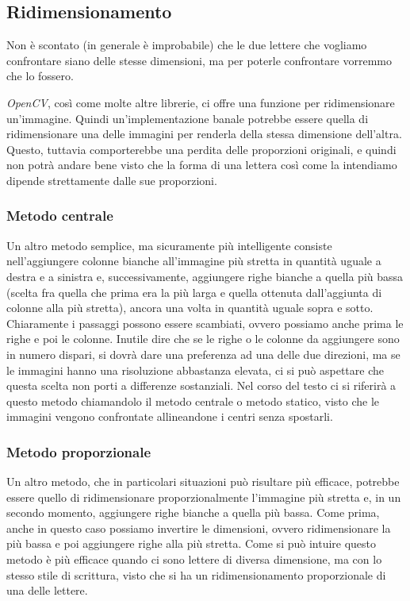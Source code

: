 \subsection{Ridimensionamento}\label{ssect:rescaling}

Non \`e scontato (in generale \`e improbabile) che le due lettere che vogliamo confrontare siano delle stesse dimensioni, ma per poterle confrontare vorremmo che lo fossero.

\emph{OpenCV}, cos\`i come molte altre librerie, ci offre una funzione per ridimensionare un'immagine. Quindi un'implementazione banale potrebbe essere quella di ridimensionare una delle immagini per renderla della stessa dimensione dell'altra. Questo, tuttavia comporterebbe una perdita delle proporzioni originali, e quindi non potr\`a andare bene visto che la forma di una lettera cos\`i come la intendiamo dipende strettamente dalle sue proporzioni.

\subsubsection{Metodo centrale}

Un altro metodo semplice, ma sicuramente pi\`u intelligente consiste nell'aggiungere colonne bianche all'immagine pi\`u stretta in quantit\`a uguale a destra e a sinistra e, successivamente, aggiungere righe bianche a quella pi\`u bassa (scelta fra quella che prima era la pi\`u larga e quella ottenuta dall'aggiunta di colonne alla pi\`u stretta), ancora una volta in quantit\`a uguale sopra e sotto. Chiaramente i passaggi possono essere scambiati, ovvero possiamo anche prima le righe e poi le colonne. Inutile dire che se le righe o le colonne da aggiungere sono in numero dispari, si dovr\`a dare una preferenza ad una delle due direzioni, ma se le immagini hanno una risoluzione abbastanza elevata, ci si pu\`o aspettare che questa scelta non porti a differenze sostanziali. Nel corso del testo ci si riferir\`a a questo metodo chiamandolo il metodo centrale o metodo statico, visto che le immagini vengono confrontate allineandone i centri senza spostarli.

\subsubsection{Metodo proporzionale}

Un altro metodo, che in particolari situazioni pu\`o risultare pi\`u efficace, potrebbe essere quello di ridimensionare proporzionalmente l'immagine pi\`u stretta e, in un secondo momento, aggiungere righe bianche a quella pi\`u bassa. Come prima, anche in questo caso possiamo invertire le dimensioni, ovvero ridimensionare la pi\`u bassa e poi aggiungere righe alla pi\`u stretta. Come si pu\`o intuire questo metodo \`e pi\`u efficace quando ci sono lettere di diversa dimensione, ma con lo stesso stile di scrittura, visto che si ha un ridimensionamento proporzionale di una delle lettere.

